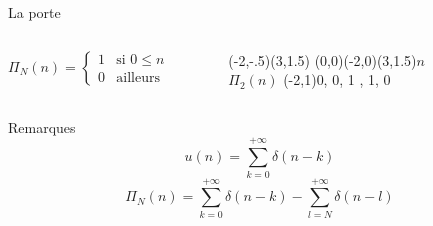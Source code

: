 \documentclass{beamer}
\begin{document}
\begin{frame}
\begin{block}{La porte}
\begin{columns}[t]
	\begin{column}{5cm}
	\smallbreak 
		\[
		\Pi_{N}(n)=
		\begin{cases}
		1 & \text{si } 0 \leq n \leq N-1 \\
		0 & \text{ailleurs}
		\end{cases}
		\]
	\end{column}
	\begin{column}{5cm}
		\begin{figure}
			\begin{pspicture}[showgrid=false](-2,-.5)(3,1.5)
				\psaxeslabels{->}(0,0)(-2,0)(3,1.5){$n$}{$\Pi_{2}(n)$}
				\psstem[stemhead=o, stemtag](-2,1){0, 0, 1 , 1, 0}  
			\end{pspicture}
		\end{figure}
	\end{column}
\end{columns}
\end{block}
\pause
\begin{alertblock}{Remarques}
\[
u(n) = \sum_{k=0}^{+\infty} \delta (n-k)
\] 
\[
\Pi_{N}(n) = \sum_{k=0}^{+\infty} \delta (n-k) - \sum_{l=N}^{+\infty}
\delta(n-l)
\] 
\end{alertblock} 
\end{frame}
\end{document}
